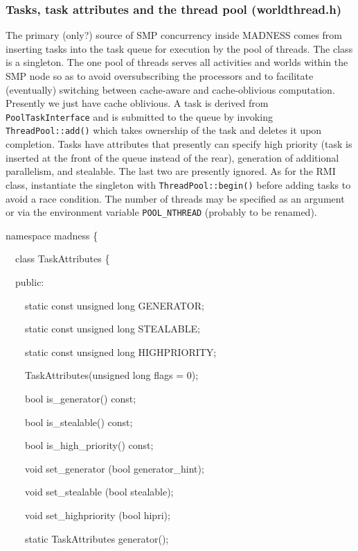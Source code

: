 \documentclass[letterpaper]{article}
\begin{document}
\subsubsection{Tasks, task attributes and the thread pool (worldthread.h)}
The primary (only?) source of SMP concurrency inside MADNESS comes from inserting tasks into the task queue for
execution by the pool of threads. The class is a singleton. The one pool of threads serves all activities and worlds
within the SMP node so as to avoid oversubscribing the processors and to facilitate (eventually) switching between
cache-aware and cache-oblivious computation. Presently we just have cache oblivious. A task is derived from
\texttt{PoolTaskInterface} and is submitted to the queue by invoking \texttt{ThreadPool::add()} which takes ownership
of the task and deletes it upon completion. Tasks have attributes that presently can specify high priority (task is
inserted at the front of the queue instead of the rear), generation of additional parallelism, and stealable. The last
two are presently ignored. As for the RMI class, instantiate the singleton with \texttt{ThreadPool::begin()} before
adding tasks to avoid a race condition. The number of threads may be specified as an argument or via the environment
variable \texttt{POOL\_NTHREAD} (probably to be renamed).

{\ttfamily
namespace madness \{}

{\ttfamily
\ \ class TaskAttributes \{}

{\ttfamily
\ \ public:}

{\ttfamily
\ \ \ \ static const unsigned long GENERATOR;}

{\ttfamily
\ \ \ \ static const unsigned long STEALABLE;}

{\ttfamily
\ \ \ \ static const unsigned long HIGHPRIORITY;}

{\ttfamily
\ \ \ \ TaskAttributes(unsigned long flags = 0);}

{\ttfamily
\ \ \ \ bool is\_generator() const;}

{\ttfamily
\ \ \ \ bool is\_stealable() const;}

{\ttfamily
\ \ \ \ bool is\_high\_priority() const;}

{\ttfamily
\ \ \ \ void set\_generator (bool generator\_hint);}

{\ttfamily
\ \ \ \ void set\_stealable (bool stealable);}

{\ttfamily
\ \ \ \ void set\_highpriority (bool hipri);}

{\ttfamily
\ \ \ \ static TaskAttributes generator();}
\end{document}
